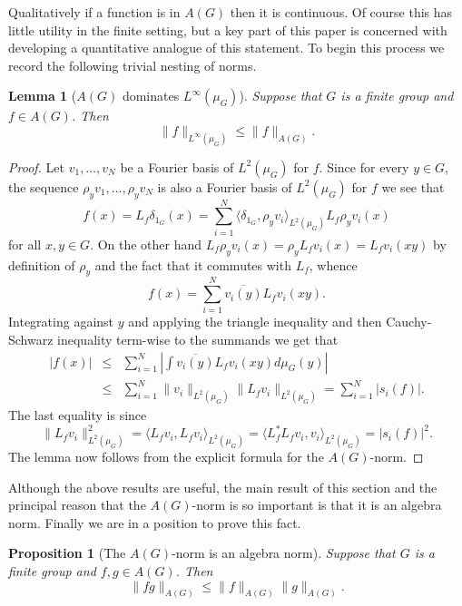 \documentclass[12pt]{amsart}
\numberwithin{equation}{section}
\theoremstyle{plain}
\newtheorem{proposition}[subsection]{Proposition}
\newtheorem{lemma}[subsection]{Lemma}
\theoremstyle{definition}
\renewcommand{\leq}{\leqslant}
\begin{document}
Qualitatively if a function is in $A(G)$ then it is continuous.  Of course this has little utility in the finite setting, but a key part of this paper is concerned with developing a quantitative analogue of this statement. To begin this process we record the following trivial nesting of norms.
\begin{lemma}[$A(G)$ dominates $L^\infty(\mu_G)$]\label{lem.linfag}
Suppose that $G$ is a finite group and $f \in A(G)$. Then
\begin{equation*}
\|f\|_{L^\infty(\mu_G)} \leq \|f\|_{A(G)}.
\end{equation*}
\end{lemma}
\begin{proof}
Let $v_1,\dots,v_N$ be a Fourier basis of $L^2(\mu_G)$ for $f$.  Since for every $y \in G$, the sequence $\rho_yv_1,\dots,\rho_yv_N$ is also a Fourier basis of $L^2(\mu_G)$ for $f$ we see that
\begin{equation*}
f(x)=L_f\delta_{1_G}(x)=\sum_{i=1}^N{\langle \delta_{1_G},\rho_yv_i\rangle_{L^2(\mu_G)}L_f\rho_yv_i(x)}
\end{equation*}
for all $x,y \in G$.  On the other hand $L_f\rho_yv_i(x)=\rho_yL_fv_i(x) = L_fv_i(xy)$ by definition of $\rho_y$ and the fact that it commutes with $L_f$, whence
\begin{equation*}
f(x)=\sum_{i=1}^N{\overline{v_i(y)}L_fv_i(xy)}.
\end{equation*}
Integrating against $y$ and applying the triangle inequality and then Cauchy-Schwarz inequality term-wise to the summands we get that
\begin{eqnarray*}
|f(x)| & \leq & \sum_{i=1}^N{|\int{\overline{v_i(y)}L_fv_i(xy)d\mu_G(y)}|}\\ & \leq & \sum_{i=1}^N{\|v_i\|_{L^2(\mu_G)}\|L_fv_i\|_{L^2(\mu_G)}} = \sum_{i=1}^N{|s_i(f)|}.
\end{eqnarray*}
The last equality is since
\begin{equation*}
\|L_fv_i\|_{L^2(\mu_G)}^2 = \langle L_f v_i,L_fv_i\rangle_{L^2(\mu_G)} = \langle L_f^*L_fv_i,v_i\rangle_{L^2(\mu_G)} = |s_i(f)|^2.
\end{equation*}
The lemma now follows from the explicit formula for the $A(G)$-norm.
\end{proof}
Although the above results are useful, the main result of this section and the principal reason that the $A(G)$-norm is so important is that it is an algebra norm.  Finally we are in a position to prove this fact.
\begin{proposition}[The $A(G)$-norm is an algebra norm]
Suppose that $G$ is a finite group and $f,g \in A(G)$.  Then
\begin{equation*}
\|fg\|_{A(G)}\leq \|f\|_{A(G)}\|g\|_{A(G)}.
\end{equation*}
\end{proposition}
\end{document}
